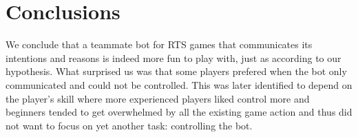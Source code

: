 \chapter{Conclusions}
We conclude that a teammate bot for RTS games that communicates its intentions and reasons is indeed more fun to play with, just as according to our hypothesis. What surprised us was that some players prefered when the bot only communicated and could not be controlled. This was later identified to depend on the player's skill where more experienced players liked control more and beginners tended to get overwhelmed by all the existing game action and thus did not want to focus on yet another task: controlling the bot.